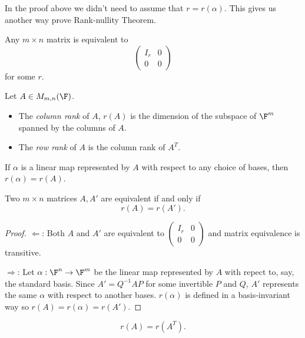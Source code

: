 \documentclass[a4paper]{article}
\theoremstyle{definition}
\begin{document}
\begin{rmk}
  In the proof above we didn't need to assume that \(r = r(\alpha)\). This gives us another way prove Rank-nullity Theorem.
\end{rmk}

\begin{cor}
  Any \(m\times n\) matrix is equivalent to
  \[
  \begin{pmatrix}
      I_r & 0 \\
      0 & 0
    \end{pmatrix}
  \]
  for some \(r\).
\end{cor}

\begin{defi}
  Let \(A\in M_{m,n}(\F)\).
  \begin{itemize}
  \item The \emph{column rank} of \(A\), \(r(A)\) is the dimension of the subspace of \(\F^m\) spanned by the columns of \(A\).
  \item The \emph{row rank} of \(A\) is the column rank of \(A^T\).
  \end{itemize}
\end{defi}

\begin{note}
  If \(\alpha\) is a linear map represented by \(A\) with respect to any choice of bases, then \(r(\alpha) = r(A)\).
\end{note}

\begin{prop}
  Two \(m\times n\) matrices \(A, A'\) are equivalent if and only if
  \[
    r(A) = r(A').
  \]
\end{prop}

\begin{proof}
  \(\Leftarrow\): Both \(A\) and \(A'\) are equivalent to \(\begin{pmatrix}
      I_r & 0 \\
      0 & 0
    \end{pmatrix}\) and matrix equivalence is transitive.

    \(\Rightarrow\): Let \(\alpha:\F^n\to \F^m\) be the linear map represented by \(A\) with repect to, say, the standard basis. Since \(A'=Q^{-1}AP\) for some invertible \(P\) and \(Q\), \(A'\) represents the same \(\alpha\) with respect to another bases. \(r(\alpha)\) is defined in a basis-invariant way so \(r(A) = r(\alpha) = r(A')\).
\end{proof}

\begin{thm}
  \label{thm:upper corner matrix}
  \[
    r(A) = r(A^T).
  \]
\end{thm}
\end{document}

